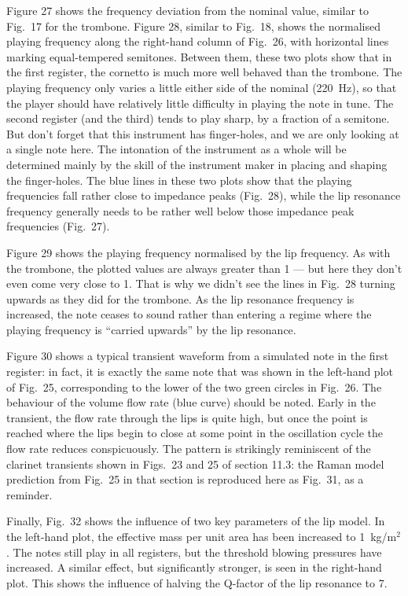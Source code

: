  Figure 27 shows the frequency deviation from the nominal value, similar to 
  Fig.\ 17 for the trombone. Figure 28, similar to Fig.\ 18, shows the 
  normalised playing frequency along the right-hand column of Fig.\ 26, with 
  horizontal lines marking equal-tempered semitones. Between them, these two 
  plots show that in the first register, the cornetto is much more well behaved 
  than the trombone. The playing frequency only varies a little either side of 
  the nominal (220~Hz), so that the player should have relatively little 
  difficulty in playing the note in tune. The second register (and the third) 
  tends to play sharp, by a fraction of a semitone. But don’t forget that this 
  instrument has finger-holes, and we are only looking at a single note here. 
  The intonation of the instrument as a whole will be determined mainly by the 
  skill of the instrument maker in placing and shaping the finger-holes. The 
  blue lines in these two plots show that the playing frequencies fall rather 
  close to impedance peaks (Fig.\ 28), while the lip resonance frequency 
  generally needs to be rather well below those impedance peak frequencies 
  (Fig.\ 27). 

  Figure 29 shows the playing frequency normalised by the lip frequency. As 
  with the trombone, the plotted values are always greater than 1 — but here 
  they don’t even come very close to 1. That is why we didn’t see the lines in 
  Fig.\ 28 turning upwards as they did for the trombone. As the lip resonance 
  frequency is increased, the note ceases to sound rather than entering a 
  regime where the playing frequency is “carried upwards” by the lip resonance. 

  Figure 30 shows a typical transient waveform from a simulated note in the 
  first register: in fact, it is exactly the same note that was shown in the 
  left-hand plot of Fig.\ 25, corresponding to the lower of the two green 
  circles in Fig.\ 26. The behaviour of the volume flow rate (blue curve) 
  should be noted. Early in the transient, the flow rate through the lips is 
  quite high, but once the point is reached where the lips begin to close at 
  some point in the oscillation cycle the flow rate reduces conspicuously. The 
  pattern is strikingly reminiscent of the clarinet transients shown in Figs.\ 
  23 and 25 of section 11.3: the Raman model prediction from Fig.\ 25 in that 
  section is reproduced here as Fig.\ 31, as a reminder. 

  Finally, Fig.\ 32 shows the influence of two key parameters of the lip model. 
  In the left-hand plot, the effective mass per unit area has been increased to 
  1~kg/m$^2$. The notes still play in all registers, but the threshold blowing 
  pressures have increased. A similar effect, but significantly stronger, is 
  seen in the right-hand plot. This shows the influence of halving the Q-factor 
  of the lip resonance to 7. 

